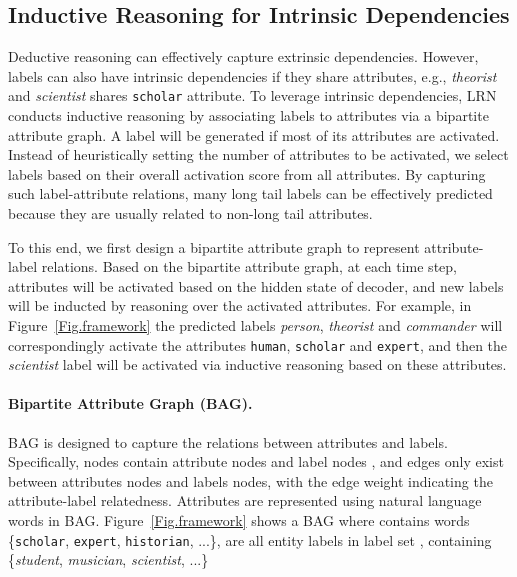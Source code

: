 \documentclass[11pt]{article}
\begin{document}
\subsection{Inductive Reasoning for Intrinsic Dependencies}
Deductive reasoning can effectively capture extrinsic dependencies. However, labels can also have intrinsic dependencies if they share attributes, e.g., \textit{theorist} and \textit{scientist} shares \texttt{scholar} attribute. To leverage intrinsic dependencies, LRN conducts inductive reasoning by associating labels to attributes via a bipartite attribute graph. A label will be generated if most of its attributes are activated. Instead of heuristically setting the number of attributes to be activated, we select labels based on their overall activation score from all attributes. By capturing such label-attribute relations, many long tail labels can be effectively predicted because they are usually related to non-long tail attributes. 

To this end, we first design a bipartite attribute graph to represent attribute-label relations. Based on the bipartite attribute graph, at each time step, attributes will be activated based on the hidden state of decoder, and new labels will be inducted by reasoning over the activated attributes. For example, in Figure~\ref{Fig.framework} the predicted labels \textit{person}, \textit{theorist} and \textit{commander} will correspondingly activate the attributes \texttt{human}, \texttt{scholar} and \texttt{expert}, and then the \textit{scientist} label will be activated via inductive reasoning based on these attributes.

\paragraph{Bipartite Attribute Graph (BAG).}\label{AG method} BAG  is designed to capture the relations between attributes and labels. Specifically, nodes  contain attribute nodes  and label nodes , and edges  only exist between attributes nodes and labels nodes, with the edge weight indicating the attribute-label relatedness. Attributes are represented using natural language words in BAG. Figure~\ref{Fig.framework} shows a BAG where  contains words \{\texttt{scholar}, \texttt{expert}, \texttt{historian}, ...\},  are all entity labels in label set , containing \{\textit{student}, \textit{musician}, \textit{scientist}, ...\}
\end{document}
